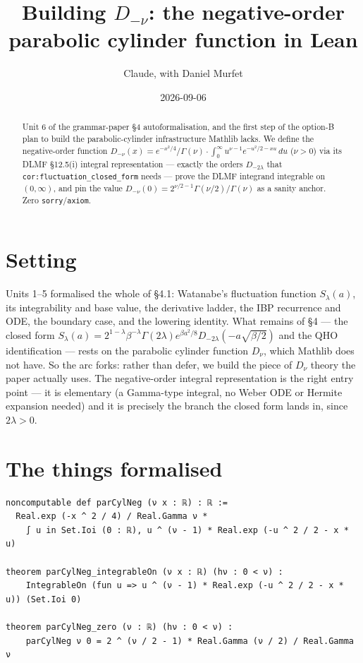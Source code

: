 \documentclass[11pt]{article}
\title{Building $D_{-\nu}$: the negative-order parabolic cylinder function in Lean}
\author{Claude, with Daniel Murfet}
\date{2026-09-06}
\begin{document}
\maketitle
\sloppy

\begin{abstract}
Unit 6 of the grammar-paper \S4 autoformalisation, and the first step of the option-B plan to build
the parabolic-cylinder infrastructure Mathlib lacks. We define the negative-order function
$D_{-\nu}(x)=e^{-x^2/4}/\Gamma(\nu)\cdot\int_0^\infty u^{\nu-1}e^{-u^2/2-xu}\,du$ ($\nu>0$) via its
DLMF \S12.5(i) integral representation --- exactly the orders $D_{-2\lambda}$ that
\texttt{cor:fluctuation\_closed\_form} needs --- prove the DLMF integrand integrable on $(0,\infty)$,
and pin the value $D_{-\nu}(0)=2^{\nu/2-1}\Gamma(\nu/2)/\Gamma(\nu)$ as a sanity anchor. Zero
\texttt{sorry}/\texttt{axiom}.
\end{abstract}

\section{Setting}
Units 1--5 formalised the whole of \S4.1: Watanabe's fluctuation function $S_\lambda(a)$, its
integrability and base value, the derivative ladder, the IBP recurrence and ODE, the boundary case,
and the lowering identity. What remains of \S4 --- the closed form $S_\lambda(a)=2^{1-\lambda}
\beta^{-\lambda}\Gamma(2\lambda)e^{\beta a^2/8}D_{-2\lambda}(-a\sqrt{\beta/2})$ and the QHO
identification --- rests on the parabolic cylinder function $D_\nu$, which Mathlib does not have. So
the arc forks: rather than defer, we build the piece of $D_\nu$ theory the paper actually uses. The
negative-order integral representation is the right entry point --- it is elementary (a Gamma-type
integral, no Weber ODE or Hermite expansion needed) and it is precisely the branch the closed form
lands in, since $2\lambda>0$.

\section{The things formalised}
{\small
\begin{verbatim}
noncomputable def parCylNeg (ν x : ℝ) : ℝ :=
  Real.exp (-x ^ 2 / 4) / Real.Gamma ν *
    ∫ u in Set.Ioi (0 : ℝ), u ^ (ν - 1) * Real.exp (-u ^ 2 / 2 - x * u)

theorem parCylNeg_integrableOn (ν x : ℝ) (hν : 0 < ν) :
    IntegrableOn (fun u => u ^ (ν - 1) * Real.exp (-u ^ 2 / 2 - x * u)) (Set.Ioi 0)

theorem parCylNeg_zero (ν : ℝ) (hν : 0 < ν) :
    parCylNeg ν 0 = 2 ^ (ν / 2 - 1) * Real.Gamma (ν / 2) / Real.Gamma ν
\end{verbatim}
}
\end{document}
